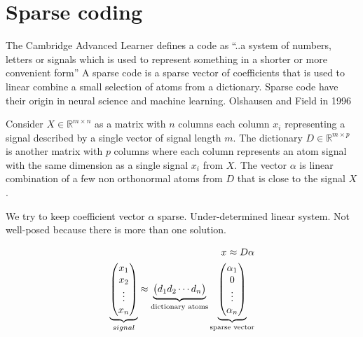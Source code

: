 \chapter{Sparse coding}
\thispagestyle{empty}

The Cambridge Advanced Learner defines a code as ``..a system of numbers, letters or signals which is used to represent something in a shorter or more convenient form''
A sparse code is a sparse vector of coefficients that is used to linear combine a small selection of atoms from a dictionary.
Sparse code have their origin in neural science and machine learning. Olshausen and Field in 1996 \cite{Olshausen1996}


Consider $X \in \mathbb{R}^{m\times n}$  as a matrix with $n$ columns each column $x_{i}$ representing a signal described by a single vector of signal length $m$.
The dictionary $D\in\mathbb{R}^{m \times p}$ is another matrix with $p$ columns where each column represents an atom signal with the same dimension as a single signal $x_{i}$ from $X$.
The vector $\alpha$ is linear combination of a few non orthonormal atoms from $D$ that is close to the signal $X$.

We try to keep coefficient vector $\alpha$ sparse. 
Under-determined linear system. Not well-posed because there is more than one solution. 

\begin{align}
x \approx D\alpha\notag\\
\underbrace{\begin{pmatrix} x_1 \\ x_2 \\ \vdots \\ x_n \end{pmatrix}}_{signal} \approx \underbrace{\begin{pmatrix} d_1  d_2 \cdots d_n \end{pmatrix}}_{\textrm{dictionary atoms}}
\underbrace{\begin{pmatrix} \alpha_1 \\ 0 \\ \vdots \\ \alpha_n \end{pmatrix}}_{\textrm{sparse vector}}
\end{align}

